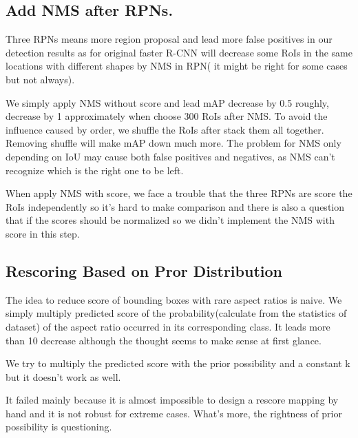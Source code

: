 \documentclass[10pt,twocolumn,letterpaper]{article}
\begin{document}
\subsection{Add NMS after RPNs.}
\par
Three RPNs means more region proposal and lead more false positives in our detection results as for original faster R-CNN will decrease some RoIs in the same locations with different shapes by NMS in RPN( it might be right for some cases but not always).

\par
We simply apply NMS without score and lead mAP decrease by 0.5 roughly, decrease by 1 approximately when choose 300 RoIs after NMS. To avoid the influence caused by order, we shuffle the RoIs after stack them all together. Removing shuffle will make mAP down much more. The problem for NMS only depending on IoU may cause both false positives and negatives, as NMS can't recognize which is the right one to be left.

\par
When apply NMS with score, we face a trouble that the three RPNs are score the RoIs independently so it’s hard to make comparison and there is also a question that if the scores should be normalized so we didn’t implement the NMS with score in this step.

\subsection{Rescoring Based on Pror Distribution}
The idea to reduce score of bounding boxes with rare aspect ratios is naive. We simply multiply predicted score of the probability(calculate from the statistics of dataset) of the aspect ratio occurred in its corresponding class. It leads more than 10 decrease although the thought seems to make sense at first glance.
\par
We try to multiply the predicted score with the prior possibility and a constant k but it doesn't work as well.
\par
It failed mainly because it is almost impossible to design a rescore mapping by hand and it is not robust for extreme cases. What's more, the rightness of prior possibility is questioning.
\end{document}
